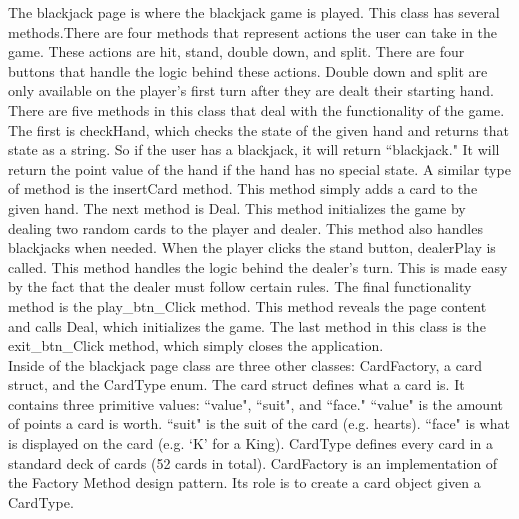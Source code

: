 \documentclass[10pt,conference,onecolumn,compsoc]{IEEEtran}
\begin{document}
\newline
The blackjack page is where the blackjack game is played. This class has several methods.There are four methods that represent actions the user can take in the game. These actions are hit, stand, double down, and split. There are four buttons that handle the logic behind these actions. Double down and split are only available on the player's first turn after they are dealt their starting hand. There are five methods in this class that deal with the functionality of the game. The first is checkHand, which checks the state of the given hand and returns that state as a string. So if the user has a blackjack, it will return ``blackjack." It will return the point value of the hand if the hand has no special state. A similar type of method is the insertCard method. This method simply adds a card to the given hand. The next method is Deal. This method initializes the game by dealing two random cards to the player and dealer. This method also handles blackjacks when needed. When the player clicks the stand button, dealerPlay is called. This method handles the logic behind the dealer's turn. This is made easy by the fact that the dealer must follow certain rules. The final functionality method is the play\_btn\_Click method. This method reveals the page content and calls Deal, which initializes the game. The last method in this class is the exit\_btn\_Click method, which simply closes the application.\\
\newline
Inside of the blackjack page class are three other classes: CardFactory, a card struct, and the CardType enum. The card struct defines what a card is. It contains three primitive values: ``value", ``suit", and ``face." ``value" is the amount of points a card is worth. ``suit" is the suit of the card (e.g. hearts). ``face" is what is displayed on the card (e.g. `K' for a King). CardType defines every card in a standard deck of cards (52 cards in total). CardFactory is an implementation of the Factory Method design pattern. Its role is to create a card object given a CardType.
\end{document}
